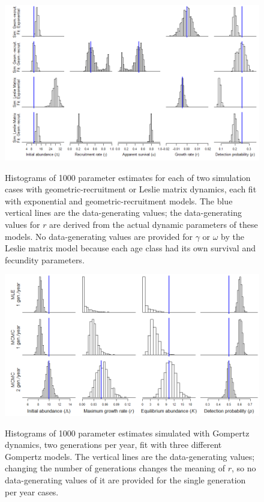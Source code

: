 \documentclass{article}
\begin{document}
\begin{figure}
\caption{Histograms of 1000 parameter estimates for each of two
simulation cases with geometric-recruitment or Leslie matrix dynamics, each fit with 
exponential and geometric-recruitment models. The blue vertical lines are the 
data-generating values; the data-generating values for $r$ are derived from
the actual dynamic parameters of these models.  No data-generating values
are provided for $\gamma$ or $\omega$ by the Leslie matrix model because
each age class had its own survival and fecundity parameters.}
  \centering
  \includegraphics{../figs/geom_mat_hists}
\label{fig:geom_mat_hists}
\end{figure}

\begin{figure}
\caption{Histograms of 1000 parameter estimates simulated with Gompertz dynamics, 
two generations per year, fit with three different Gompertz models.
The vertical lines are the data-generating values; changing the number of generations
changes the meaning of $r$, so no data-generating values of it are provided for the 
single generation per year cases.}
  \centering
  \includegraphics{../figs/gomp_hists}
\label{fig:gomp_hists}
\end{figure}
\end{document}
